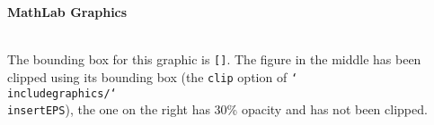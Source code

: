 \documentclass{article}
\newcommand{\cs}[1]{\texttt{\char`\\#1}}
\begin{document}
\newpage

\null\vfil

\begin{center}\previewtrue
\textsf{\textbf{MathLab Graphics}}\\[1ex]
   \\
\end{center}
The bounding box for this graphic is
\texttt{[\space{}\space{}\space{}]}.
The figure in the middle has been clipped using its bounding box (the \texttt{clip} option
of \cs{includegraphics/\cs{insertEPS}}), the
one on the right has 30\% opacity and has not been clipped.
\end{document}
